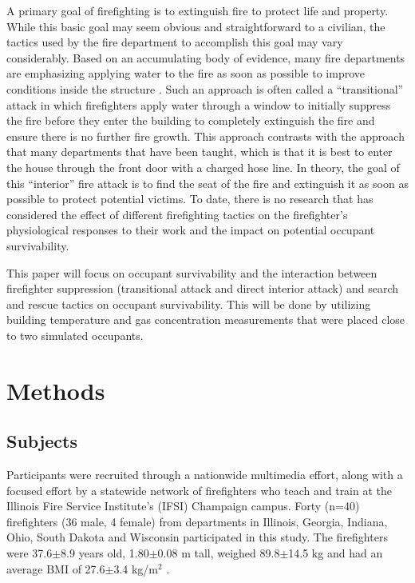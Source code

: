 \documentclass[12pt,oneside]{article}
\begin{document}
A primary goal of firefighting is to extinguish fire to protect life and property. While this basic goal may seem obvious and straightforward to a civilian, the tactics used by the fire department to accomplish this goal may vary considerably. Based on an accumulating body of evidence, many fire departments are emphasizing applying water to the fire as soon as possible to improve conditions inside the structure \cite{DHS2010}. Such an approach is often called a ``transitional'' attack in which firefighters apply water through a window to initially suppress the fire before they enter the building to completely extinguish the fire and ensure there is no further fire growth.  This approach contrasts with the approach that many departments that have been taught, which is that it is best to enter the house through the front door with a charged hose line. In theory, the goal of this ``interior'' fire attack is to find the seat of the fire and extinguish it as soon as possible to protect potential victims. To date, there is no research that has considered the effect of different firefighting tactics on the firefighter's physiological responses to their work and the impact on potential occupant survivability.

This paper will focus on occupant survivability and the interaction between firefighter suppression (transitional attack and direct interior attack) and search and rescue tactics on occupant survivability.  This will be done by utilizing building temperature and gas concentration measurements that were placed close to two simulated occupants.  

\section{Methods}
\label{sec:methods}

\subsection{Subjects}
\label{subsec:subjects}
Participants were recruited through a nationwide multimedia effort, along with a focused effort by a statewide network of firefighters who teach and train at the Illinois Fire Service Institute's (IFSI) Champaign campus. Forty (n=40) firefighters (36 male, 4 female) from departments in Illinois, Georgia, Indiana, Ohio, South Dakota and Wisconsin participated in this study. The firefighters were 37.6$\pm$8.9 years old, 1.80$\pm$0.08 m tall, weighed 89.8$\pm$14.5 kg and had an average BMI of 27.6$\pm$3.4 kg/m$^2$ \cite{Horn:Ergonomics}.
\end{document}

